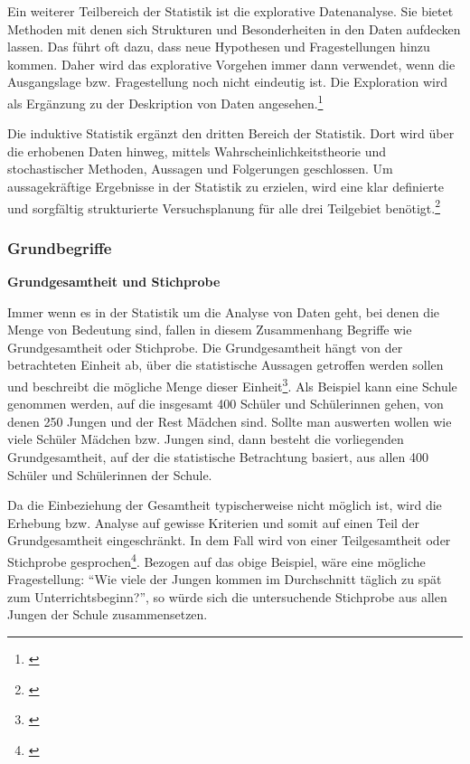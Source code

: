 Ein weiterer Teilbereich der Statistik ist die explorative Datenanalyse. Sie bietet Methoden mit denen sich Strukturen und Besonderheiten in den Daten aufdecken lassen. Das führt oft dazu, dass neue Hypothesen und Fragestellungen hinzu kommen. Daher wird das explorative Vorgehen immer dann verwendet, wenn die Ausgangslage bzw. Fragestellung noch nicht eindeutig ist. Die Exploration wird als Ergänzung zu der Deskription von Daten angesehen.\footnote{\cite[vgl.][11\psq]{Statistik2016}}

Die induktive Statistik ergänzt den dritten Bereich der Statistik. Dort wird über die erhobenen Daten hinweg, mittels Wahrscheinlichkeitstheorie und stochastischer Methoden, Aussagen und Folgerungen geschlossen. Um aussagekräftige Ergebnisse in der Statistik zu erzielen, wird eine klar definierte und sorgfältig strukturierte Versuchsplanung für alle drei Teilgebiet benötigt.\footnote{\cite[vgl.][12]{Statistik2016}}


\subsubsection{Grundbegriffe}
\textbf{Grundgesamtheit und Stichprobe}

Immer wenn es in der Statistik um die Analyse von Daten geht, bei denen die Menge von Bedeutung sind, fallen in diesem Zusammenhang Begriffe wie Grundgesamtheit oder Stichprobe. Die Grundgesamtheit hängt von der betrachteten Einheit ab, über die statistische Aussagen getroffen werden sollen und beschreibt die mögliche Menge dieser Einheit\footnote{\cite[vgl.][13]{Statistik2016}}. Als Beispiel kann eine Schule genommen werden, auf die insgesamt 400 Schüler und Schülerinnen gehen, von denen 250 Jungen und der Rest Mädchen sind. Sollte man auswerten wollen wie viele Schüler Mädchen bzw. Jungen sind, dann besteht die vorliegenden Grundgesamtheit, auf der die statistische Betrachtung basiert, aus allen 400 Schüler und Schülerinnen der Schule.

Da die Einbeziehung der Gesamtheit typischerweise nicht möglich ist, wird die Erhebung bzw. Analyse auf gewisse Kriterien und somit auf einen Teil der Grundgesamtheit eingeschränkt. In dem Fall wird von einer Teilgesamtheit oder Stichprobe gesprochen\footnote{\cite[vgl.][13]{Statistik2016}}. Bezogen auf das obige Beispiel, wäre eine mögliche Fragestellung: \enquote{Wie viele der Jungen kommen im Durchschnitt täglich zu spät zum Unterrichtsbeginn?}, so würde sich die untersuchende Stichprobe aus allen Jungen der Schule zusammensetzen.

